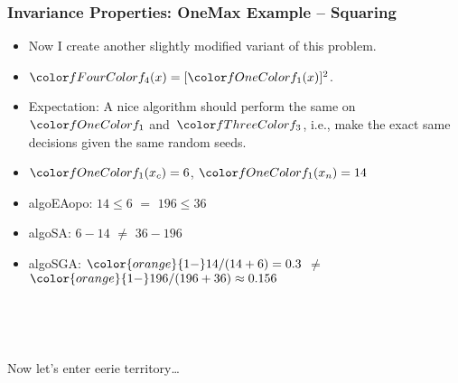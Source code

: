 \documentclass[aspectratio=169,mathserif,notheorems]{beamer}%
\begin{document}
\begin{frame}%
\frametitle{Invariance Properties: OneMax Example -- Squaring}%
\parbox{0.415\paperwidth}{%
\begin{itemize}%
\item Now I create another slightly modified variant of this problem.%
\item<2-> $\fn{4}(x)=[\fn{1}(x)]^2$.%
\item<3-> Expectation: A nice algorithm should perform the same on~$\fn{1}$ and~$\fn{3}$, i.e., make the exact same decisions given the same random seeds.%
%
\item<4-> $\fn{1}(x_c)=6$, $\fn{1}(x_n)=14$%
%
\item<6-> \gls{algoEAopo}: $14\leq6$ \textcolor{greenYesColor}{$\mathbf{=}$} $196\leq36$ \greenYes%
%
\item<7-> \gls{algoSA}: $6-14$ \textcolor{redNoColor}{$\mathbf{\neq}$} $36-196$ \redNo%
%
\item<8-> \gls{algoSGA}: ${\color{orange}{1-}}14/(14+6)=0.3$ \textcolor{redNoColor}{$\mathbf{\neq}$} ${\color{orange}{1-}}196/(196+36)\approx0.156$ \redNo%
\end{itemize}%
}%
%
%
%
%
%
%
%
\end{frame}%
%
\begin{frame}%
\centering%
\strut\\\strut\vfill\strut\\\strut%
{\large{Now let's enter eerie territory\dots}}%
\strut\\\strut\vfill\strut\\\strut%
\end{frame}%
%
\end{document}
